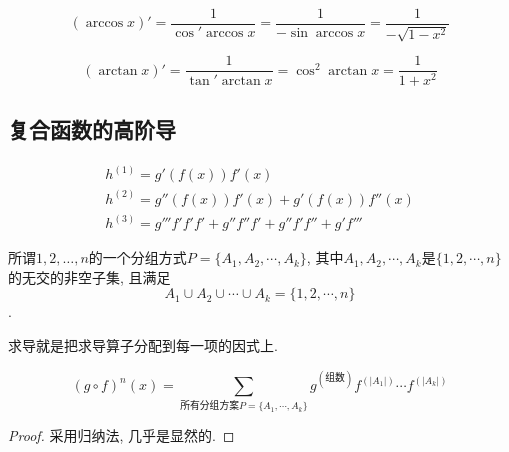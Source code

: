 \begin{example}
    \begin{equation}
      \left( \arccos x \right) ' = \frac{1}{\cos' \arccos x} = \frac{1}{- \sin \arccos x } = \frac{1}{- \sqrt{1-x^{2}}}
    \end{equation}
\end{example}

\begin{example}
    \begin{equation}
      \left( \arctan x \right) ' = \frac{1}{\tan ' \arctan x} = \cos^{2} \arctan x = \frac{1}{1 + x^{2}}
    \end{equation}
\end{example}

\subsection{复合函数的高阶导}
\begin{equation}
  \begin{gathered}
    h^{(1)} = g'\left( f\left( x \right)  \right) f'\left( x \right) \\
    h^{(2)} = g'' \left( f\left( x \right)  \right) f'\left( x \right) + g' \left( f\left( x \right)  \right) f''\left( x \right) \\
    h^{(3)} = g''' f' f' f' + g'' f'' f' + g'' f' f'' + g' f'''
  \end{gathered}
\end{equation}

\begin{definition}
    所谓$1, 2 , \ldots ,n$的一个分组方式$P = \{ A_1,A_2,\cdots,A_k \}$, 其中$A_1,A_2,\cdots,A_k$是$\{ 1,2,\cdots,n \}$的无交的非空子集, 且满足
    \begin{equation}
      A_1 \cup A_2 \cup  \cdots \cup A_k = \{ 1,2,\cdots,n \}
    \end{equation}.
\end{definition}
求导就是把求导算子分配到每一项的因式上.
\begin{theorem}
    \begin{equation}
      \left( g\circ f \right) ^{n} (x) = \sum_{\text{所有分组方案$P = \{A_1, \cdots, A_k\}$}}g^{(\text{组数})} f^{(|A_1|)} \cdots f^{(|A_k|)}
    \end{equation}
\end{theorem}

\begin{proof}
  采用归纳法, 几乎是显然的.
\end{proof}

